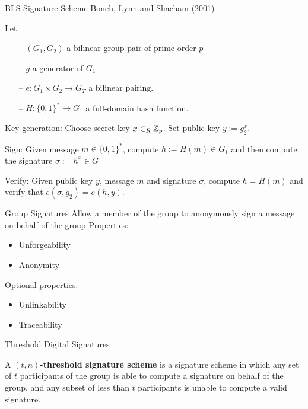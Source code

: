 \begin{frame}{BLS Signature Scheme}
Boneh, Lynn and Shacham (2001)

Let:
\begin{itemize}
\item[--] $(G_1,G_2)$ a bilinear group pair of prime order $p$
\item[--] $g$ a generator of $G_1$
\item[--] $e: G_1 \times G_2 \rightarrow G_T$ a bilinear pairing.
\item[--] $H: \{0,1\}^\ast \rightarrow G_1$ a full-domain hash function.
\end{itemize}
Key generation: Choose secret key $x \in_R {\mathbb Z}_p$. Set public key $y:=g_2^x$.

Sign: Given message $m \in \{0,1\}^\ast$, compute $h:= H(m) \in G_1$ and then compute the signature $\sigma:= h^x \in G_1$

Verify: Given public key $y$, message $m$ and signature $\sigma$, compute $h = H(m)$ and verify that $e(\sigma,g_2) = e(h,y)$.
\end{frame}

\begin{frame}{Group Signatures}
Allow a member of the group to anonymously sign a message on behalf of the group
Properties:
\begin{itemize}
\item Unforgeability
\item Anonymity
\end{itemize}

Optional properties:
\begin{itemize}
\item Unlinkability
\item Traceability
\end{itemize}

\end{frame}

\begin{frame}{Threshold Digital Signatures}
\begin{defn}
A $(t,n)$\textbf{-threshold signature scheme} is a signature scheme in which any set of $t$ participants of the group is able to compute a signature on behalf of the group, and any subset of less than $t$ participants is unable to compute a valid signature.
\end{defn}

\end{frame}

